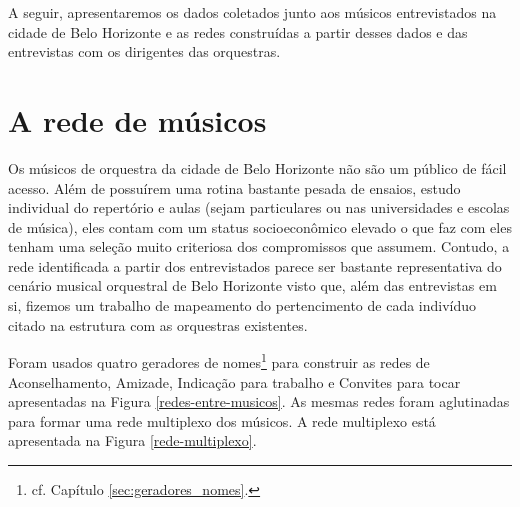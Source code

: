 \documentclass[a4paper, 12pt, openright, oneside, german, french, english, brazil]{abntex2}
\begin{document}
	A seguir, apresentaremos os dados coletados junto aos músicos entrevistados na cidade de Belo Horizonte e as redes construídas a partir desses dados e das entrevistas com os dirigentes das orquestras.
	
	
	
	\chapter{A rede de músicos}
	
	
	Os músicos de orquestra da cidade de Belo Horizonte não são um público de fácil acesso. Além de possuírem uma rotina bastante pesada de ensaios, estudo individual do repertório e aulas (sejam particulares ou nas universidades e escolas de música), eles contam com um status socioeconômico elevado o que faz com eles tenham uma seleção muito criteriosa dos compromissos que assumem. Contudo, a rede identificada a partir dos entrevistados parece ser bastante representativa do cenário musical orquestral de Belo Horizonte visto que, além das entrevistas em si, fizemos um trabalho de mapeamento do pertencimento de cada indivíduo citado na estrutura com as orquestras existentes.
	
	Foram usados quatro geradores de nomes\footnote{cf. Capítulo \ref{sec:geradores_nomes}.} para construir as redes de Aconselhamento, Amizade, Indicação para trabalho e Convites para tocar apresentadas na Figura \ref{redes-entre-musicos}. 	As mesmas redes foram aglutinadas para formar uma rede multiplexo dos músicos. A rede multiplexo está apresentada na Figura \ref{rede-multiplexo}.
	
\end{document}
